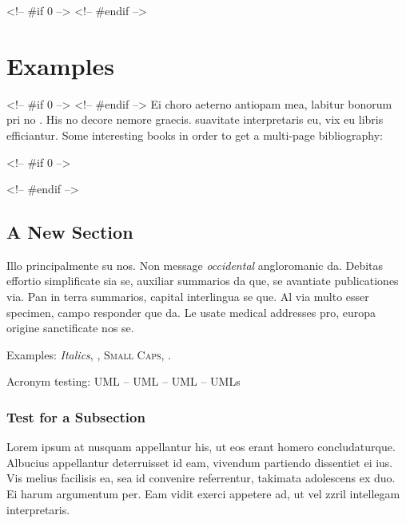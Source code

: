 <!-- #if 0 -->
<!-- #endif -->
\chapter{Examples}\label{ch:examples}
<!-- #if 0 -->
<!-- #endif -->
Ei choro aeterno antiopam mea, labitur bonorum pri no
\citeauthor{taleb:2012} \citep{taleb:2012}. His no decore
nemore graecis.
suavitate interpretaris eu, vix eu libris efficiantur.
 Some interesting books in order to get a multi-page bibliography: \cite{ferriss:2016,greenwald:2014,adams:2013,pausch:2008,aurelius:2002,adams:1996,trump:1987,feynman:1985,cialdini:1984,seneca,orwell:1949,taleb:2010,munger:2008,postman:2005,harari:2014,peterson:2018,taleb:2018,frankl:1959}

<!-- #if 0 -->

<!-- #endif -->

\section{A New Section}
Illo principalmente su nos. Non message \emph{occidental} angloromanic
da. Debitas effortio simplificate sia se, auxiliar summarios da que,
se avantiate publicationes via. Pan in terra summarios, capital
interlingua se que. Al via multo esser specimen, campo responder que
da. Le usate medical addresses pro, europa origine sanctificate nos
se.

Examples: \textit{Italics}, , \textsc{Small
Caps}, .

Acronym testing: \ac{UML} -- \acs{UML} -- \acf{UML} -- \acp{UML}


\subsection{Test for a Subsection}
Lorem ipsum at nusquam appellantur his, ut eos erant homero
concludaturque. Albucius appellantur deterruisset id eam, vivendum
partiendo dissentiet ei ius. Vis melius facilisis ea, sea id convenire
referrentur, takimata adolescens ex duo. Ei harum argumentum per. Eam
vidit exerci appetere ad, ut vel zzril intellegam interpretaris.


